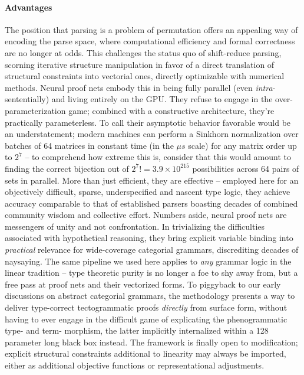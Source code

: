 \paragraph{Advantages}
The position that parsing is a problem of permutation offers an appealing way of encoding the parse space, where computational efficiency and formal correctness are no longer at odds.
This challenges the status quo of shift-reduce parsing, scorning iterative structure manipulation in favor of a direct translation of structural constraints into vectorial ones, directly optimizable with numerical methods.
Neural proof nets embody this in being fully parallel (even \textit{intra}-sententially) and living entirely on the GPU.
They refuse to engage in the over-parameterization game; combined with a constructive architecture, they're practically parameterless.
To call their asymptotic behavior favorable would be an understatement; modern machines can perform a Sinkhorn normalization over batches of 64 matrices in constant time (in the $\mu s$ scale) for any matrix order up to $2^7$ -- to comprehend how extreme this is, consider that this would amount to finding the correct bijection out of ${2^7}! = 3.9\times 10^{215}$ possibilities across 64 pairs of sets in parallel.
More than just efficient, they are effective -- employed here for an objectively difficult, sparse, underspecified and nascent type logic, they achieve accuracy comparable to that of established parsers boasting decades of combined community wisdom and collective effort.
Numbers aside, neural proof nets are messengers of unity and not confrontation.
In trivializing the difficulties associated with hypothetical reasoning, they bring explicit variable binding into \textit{practical} relevance for wide-coverage categorial grammars, discrediting decades of naysaying.
The same pipeline we used here applies to \textit{any} grammar logic in the linear tradition -- type theoretic purity is no longer a foe to shy away from, but a free pass at proof nets and their vectorized forms.
To piggyback to our early discussions on abstract categorial grammars, the methodology presents a way to deliver type-correct tectogrammatic proofs \textit{directly} from surface form, without having to ever engage in the difficult game of explicating the phenogrammatic type- and term- morphism, the latter implicitly internalized within a 128 parameter long black box instead.
The framework is finally open to modification; explicit structural constraints additional to linearity may always be imported, either as additional objective functions or representational adjustments.

